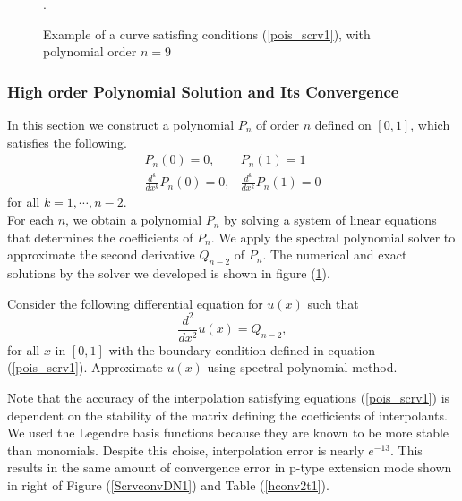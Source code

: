 
\begin{figure}[h]
    \begin{center}
    \caption{\label{scrvsol1}Example of a curve satisfing conditions (\ref{pois_scrv1}), with polynomial order $n=9$}.
    \end{center}
\end{figure}

\subsubsection {High order Polynomial Solution and Its Convergence}

In this section we construct a polynomial $P_n$ of order $n$ defined on $[0,1]$, which satisfies the following.
\begin{eqnarray}
\label{pois_scrv1}
    P_n(0) = 0, &P_n(1) = 1 \\
    \frac{d^k}{dx^k}P_n(0) = 0, &\frac{d^k}{dx^k}P_n(1) = 0
\end{eqnarray}
for all $k = 1, \cdots, n-2$. \\
For each $n$, we obtain a polynomial $P_n$ by solving a system of
linear equations that determines the coefficients of $P_n$. We
apply the spectral polynomial solver to approximate the second
derivative $Q_{n-2}$ of $P_n$. The numerical and exact solutions
by the solver we developed is shown in figure (\ref{scrvsol1}).



\begin{problem}
Consider the following differential equation for $u(x)$ such that
\begin{equation}
\label{poi_poly1}
    \frac{d^2}{dx^2} u(x) = Q_{n-2},
\end{equation}
for all $x$ in $[0, 1]$ with the boundary condition defined in
equation (\ref{pois_scrv1}). Approximate $u(x)$ using spectral
polynomial method.
\end{problem}

Note that the accuracy of the interpolation satisfying equations
(\ref{pois_scrv1}) is dependent on the stability of the matrix
defining the coefficients of interpolants. We used the Legendre
basis functions because they are known to be more stable than
monomials. Despite this choise, interpolation error is nearly
$e^{-13}$. This results in the same amount of convergence error in
p-type extension mode shown in right of Figure (\ref{ScrvconvDN1})
and Table (\ref{hconv2t1}).

